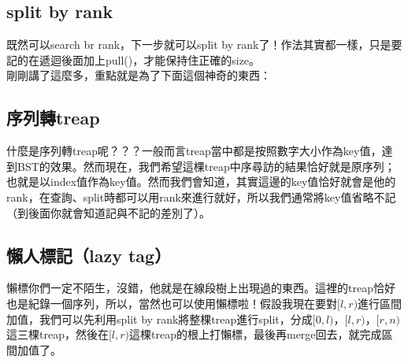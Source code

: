 \subsection{split by rank}
既然可以search br rank，下一步就可以split by rank了！作法其實都一樣，只是要記的在遞迴後面加上pull()，才能保持住正確的size。\\

剛剛講了這麼多，重點就是為了下面這個神奇的東西：
\subsection{序列轉treap}
什麼是序列轉treap呢？？？一般而言treap當中都是按照數字大小作為key值，達到BST的效果。然而現在，我們希望這棵treap中序尋訪的結果恰好就是原序列；也就是以index值作為key值。然而我們會知道，其實這邊的key值恰好就會是他的rank，在查詢、split時都可以用rank來進行就好，所以我們通常將key值省略不記（到後面你就會知道記與不記的差別了）。
\subsection{懶人標記（lazy tag）}
懶標你們一定不陌生，沒錯，他就是在線段樹上出現過的東西。這裡的treap恰好也是紀錄一個序列，所以，當然也可以使用懶標啦！假設我現在要對$[l,r)$進行區間加值，我們可以先利用split by rank將整棵treap進行split，分成$[0,l)$，$[l,r)$，$[r,n)$這三棵treap，然後在$[l,r)$這棵treap的根上打懶標，最後再merge回去，就完成區間加值了。
